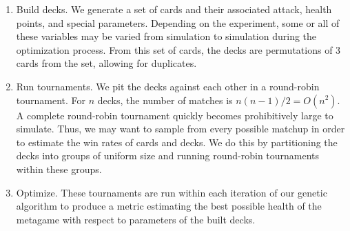 \begin{enumerate}
	\item Build decks. We generate a set of cards and their associated attack, health points, and special parameters.
	Depending on the experiment, some or all of these variables may be varied from simulation to simulation during the optimization process.
	From this set of cards, the decks are permutations of 3 cards from the set, allowing for duplicates.
	\item Run tournaments. We pit the decks against each other in a round-robin tournament. For $n$ decks,
	the number of matches is $n(n-1)/2 = O(n^2)$. A complete round-robin tournament quickly becomes prohibitively large to simulate.
	Thus, we may want to sample from every possible matchup in order to estimate the win rates of cards and decks. We do this by 
	partitioning the decks into groups of uniform size and running round-robin tournaments within these groups.
	\item Optimize. These tournaments are run within each iteration of our genetic algorithm to produce a metric estimating the best
	possible health of the metagame with respect to parameters of the built decks.
\end{enumerate}
